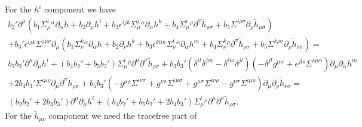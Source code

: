 \documentclass[10pt]{report}
\theoremstyle{definition}
\begin{document}
  For the $h^i$ component we have
  \begin{align}\nonumber
  b_2' \partial^\mu (b_1 \Sigma^i_\mu{}^\alpha \partial_\alpha h + b_2 \partial_\mu h^i + b_3 \epsilon^{ijk} \Sigma^j_\mu{}^\alpha \partial_\alpha h^k + b_4 \Sigma^i_\mu{}^\rho \partial^\sigma \tilde{h}_{\rho\sigma} + b_5 \Sigma^{i\rho\sigma}  \partial_\rho \tilde{h}_{\mu\sigma}) \\ \nonumber
  + b_3' \epsilon^{ijk} \Sigma^{j\mu\nu} \partial_\mu (b_1 \Sigma^k_\nu{}^\alpha \partial_\alpha h + b_2 \partial_\nu h^k + b_3 \epsilon^{klm} \Sigma^l_\nu{}^\alpha \partial_\alpha h^m + b_4 \Sigma^k_\nu{}^\rho \partial^\sigma \tilde{h}_{\rho\sigma} + b_5 \Sigma^{k\rho\sigma}  \partial_\rho \tilde{h}_{\nu\sigma}) = \\ \nonumber
  b_2  b_2' \partial^\mu \partial_\mu h^i+  (b_4 b_2' +  b_5 b_2' )  \Sigma^i_\mu{}^\rho \partial^\mu \partial^\sigma \tilde{h}_{\rho\sigma} 
  + b_3 b_3' (\delta^{il}\delta^{jm} - \delta^{im}\delta^{jl}) ( - \delta^{jl} g^{\mu\alpha} + \epsilon^{jls}\Sigma^{s\mu\alpha}) 
   \partial_\mu \partial_\alpha h^m \\ \nonumber
   + 2b_4 b_3' \Sigma^{i\mu\rho} \partial_\mu \partial^\sigma \tilde{h}_{\rho\sigma}
     + b_5 b_3' (- g^{\mu\rho} \Sigma^{i\nu\sigma} + g^{\nu\rho} \Sigma^{i\mu\sigma} + g^{\mu\sigma} \Sigma^{i\nu\rho} - g^{\nu\sigma} \Sigma^{i\mu\rho})   \partial_\mu \partial_\rho \tilde{h}_{\nu\sigma} = \\ \nonumber
      (b_2  b_2' + 2 b_3 b_3' )\partial^\mu \partial_\mu h^i+  (b_4 b_2' +  b_5 b_2' + 2b_4 b_3' )  \Sigma^i_\mu{}^\rho \partial^\mu \partial^\sigma \tilde{h}_{\rho\sigma} .
    \end{align}
  For the $\tilde{h}_{\mu\nu}$ component we need the tracefree part of
\end{document}
